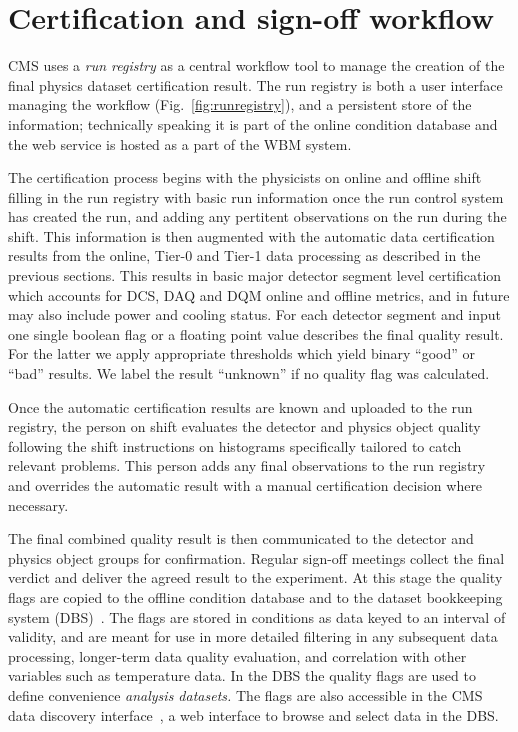 \documentclass[a4paper]{jpconf}
\begin{document}
\section{Certification and sign-off workflow}\label{certification}

CMS uses a {\em run registry} as a central workflow tool to manage the
creation of the final physics dataset certification result.  The run registry
is both a user interface managing the workflow (Fig.~\ref{fig:runregistry}),
and a persistent store of the information; technically speaking it is part of
the online condition database and the web service is hosted as a part of the
WBM system.

The certification process begins with the physicists on online and offline
shift filling in the run registry with basic run information once the run
control system has created the run, and adding any pertitent observations on
the run during the shift.  This information is then augmented with the
automatic data certification results from the online, Tier-0 and Tier-1 data
processing as described in the previous sections.  This results in basic major
detector segment level certification which accounts for DCS, DAQ and DQM
online and offline metrics, and in future may also include power and cooling
status.  For each detector segment and input one single boolean flag or a
floating point value describes the final quality result.  For the latter we
apply appropriate thresholds which yield binary ``good'' or ``bad'' results.
We label the result ``unknown'' if no quality flag was calculated.

Once the automatic certification results are known and uploaded to the run
registry, the person on shift evaluates the detector and physics object
quality following the shift instructions on histograms specifically tailored
to catch relevant problems.  This person adds any final observations to the
run registry and overrides the automatic result with a manual certification
decision where necessary.

The final combined quality result is then communicated to the detector and
physics object groups for confirmation.  Regular sign-off meetings collect the
final verdict and deliver the agreed result to the experiment.  At this stage
the quality flags are copied to the offline condition database and to the
dataset bookkeeping system (DBS)~\cite{cms_dbs_07}.  The flags are stored in
conditions as data keyed to an interval of validity, and are meant for use in
more detailed filtering in any subsequent data processing, longer-term data
quality evaluation, and correlation with other variables such as temperature
data.  In the DBS the quality flags are used to define convenience {\em
  analysis datasets.}  The flags are also accessible in the CMS data discovery
interface~\cite{cms_dbs_discovery_07}, a web interface to browse and select
data in the DBS.
\end{document}
